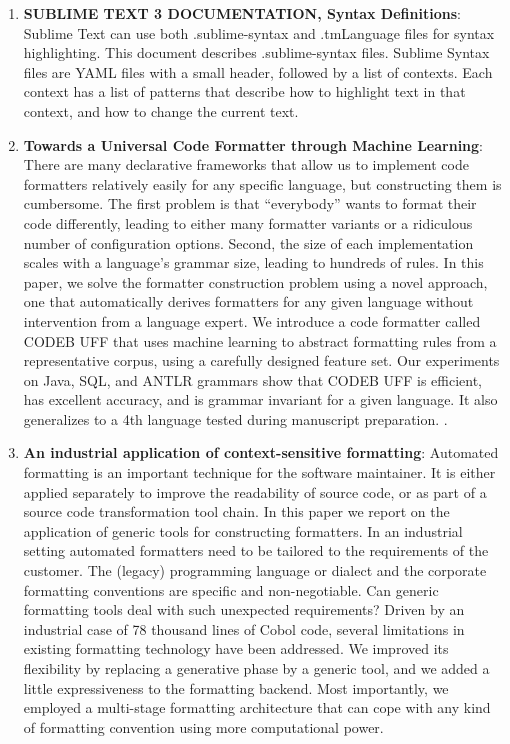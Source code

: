 \begin{englishtext}
\begin{enumerate}
    \item \textbf{SUBLIME TEXT 3 DOCUMENTATION, Syntax Definitions}: Sublime
    Text can use both .sublime-syntax and .tmLanguage files for syntax
    highlighting. This document describes .sublime-syntax files. Sublime Syntax
    files are YAML files with a small header, followed by a list of contexts.
    Each context has a list of patterns that describe how to highlight text in
    that context, and how to change the current text. \cite{Skinner}

    \item \textbf{Towards a Universal Code Formatter through Machine Learning}:
    There are many declarative frameworks that allow us to implement code
    formatters relatively easily for any specific language, but constructing
    them is cumbersome. The first problem is that “everybody” wants to format
    their code differently, leading to either many formatter variants or a
    ridiculous number of configuration options. Second, the size of each
    implementation scales with a language’s grammar size, leading to hundreds of
    rules. In this paper, we solve the formatter construction problem using a
    novel approach, one that automatically derives formatters for any given
    language without intervention from a language expert. We introduce a code
    formatter called CODEB UFF that uses machine learning to abstract formatting
    rules from a representative corpus, using a carefully designed feature set.
    Our experiments on Java, SQL, and ANTLR grammars show that CODEB UFF is
    efficient, has excellent accuracy, and is grammar invariant for a given
    language. It also generalizes to a 4th language tested during manuscript
    preparation. \cite{universalCodeFormatter}.

    \item \textbf{An industrial application of context-sensitive formatting}:
    Automated formatting is an important technique for the software maintainer.
    It is either applied separately to improve the readability of source code,
    or as part of a source code transformation tool chain. In this paper we
    report on the application of generic tools for constructing formatters. In
    an industrial setting automated formatters need to be tailored to the
    requirements of the customer. The (legacy) programming language or dialect
    and the corporate formatting conventions are specific and non-negotiable.
    Can generic formatting tools deal with such unexpected requirements? Driven
    by an industrial case of 78 thousand lines of Cobol code, several
    limitations in existing formatting technology have been addressed. We
    improved its flexibility by replacing a generative phase by a generic tool,
    and we added a little expressiveness to the formatting backend. Most
    importantly, we employed a multi-stage formatting architecture that can cope
    with any kind of formatting convention using more computational power.
    \cite{industrialApplication}


\end{enumerate}
\end{englishtext}
